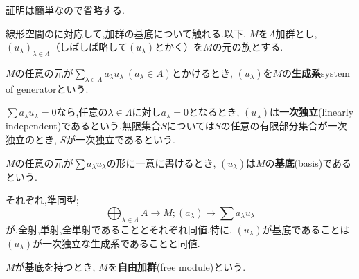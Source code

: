 証明は簡単なので省略する.

線形空間のに対応して,加群の基底について触れる.以下, $M$を$A$加群とし, $(u_\lambda)_{\lambda\in\Lambda}$（しばしば略して$(u_\lambda)$とかく）を$M$の元の族とする.

\begin{defi}[生成系]
	$M$の任意の元が$\sum_{\lambda\in\Lambda}a_\lambda u_\lambda ~(a_\lambda\in A)$とかけるとき, $(u_\lambda)$を$M$の\textbf{生成系}{system of generator}という.
\end{defi}
\begin{defi}[一次独立]
	$\sum a_\lambda u_\lambda=0$なら,任意の$\lambda\in\Lambda$に対し$a_\lambda=0$となるとき, $(u_\lambda)$は\textbf{一次独立}(linearly independent)であるという.無限集合$S$については$S$の任意の有限部分集合が一次独立のとき, $S$が一次独立であるという.
\end{defi}
\begin{defi}[基底]
	$M$の任意の元が$\sum a_\lambda u_\lambda$の形に一意に書けるとき, $(u_\lambda)$は$M$の\textbf{基底}(basis)であるという.	
\end{defi}

それぞれ,準同型;
\[\bigoplus_{\lambda\in\Lambda} A\to M;(a_\lambda)\mapsto\sum a_\lambda u_\lambda\]
が,全射,単射,全単射であることとそれぞれ同値.特に, $(u_\lambda)$が基底であることは$(u_\lambda)$が一次独立な生成系であることと同値.

\begin{defi}[自由加群]
	$M$が基底を持つとき, $M$を\textbf{自由加群}(free module)という.
\end{defi}

